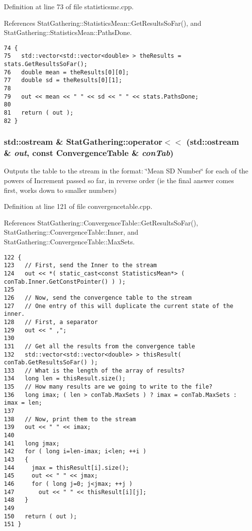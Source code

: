 Definition at line 73 of file statisticsmc.cpp.

References StatGathering::StatisticsMean::GetResultsSoFar(), and StatGathering::StatisticsMean::PathsDone.

\begin{Code}\begin{verbatim}74 {
75   std::vector<std::vector<double> > theResults = stats.GetResultsSoFar();
76   double mean = theResults[0][0];
77   double sd = theResults[0][1];
78 
79   out << mean << " " << sd << " " << stats.PathsDone;
80 
81   return ( out );
82 }
\end{verbatim}
\end{Code}


\subsubsection{\setlength{\rightskip}{0pt plus 5cm}std::ostream \& StatGathering::operator$<$$<$ (std::ostream \& {\em out}, const ConvergenceTable \& {\em conTab})}\label{namespaceStatGathering_571c4a864b3e5d6ed6047901f8634376}


Outputs the table to the stream in the format: \char`\"{}Mean SD Number\char`\"{} for each of the powers of Increment passed so far, in reverse order (ie the final answer comes first, works down to smaller numbers) 

Definition at line 121 of file convergencetable.cpp.

References StatGathering::ConvergenceTable::GetResultsSoFar(), StatGathering::ConvergenceTable::Inner, and StatGathering::ConvergenceTable::MaxSets.

\begin{Code}\begin{verbatim}122 {
123   // First, send the Inner to the stream
124   out << *( static_cast<const StatisticsMean*> ( conTab.Inner.GetConstPointer() ) );
125 
126   // Now, send the convergence table to the stream
127   // One entry of this will duplicate the current state of the inner.
128   // First, a separator
129   out << " ,";
130 
131   // Get all the results from the convergence table
132   std::vector<std::vector<double> > thisResult( conTab.GetResultsSoFar() );
133   // What is the length of the array of results?
134   long len = thisResult.size();
135   // How many results are we going to write to the file?
136   long imax; ( len > conTab.MaxSets ) ? imax = conTab.MaxSets : imax = len;
137   
138   // Now, print them to the stream
139   out << " " << imax;
140 
141   long jmax;
142   for ( long i=len-imax; i<len; ++i )
143   {
144     jmax = thisResult[i].size();
145     out << " " << jmax;
146     for ( long j=0; j<jmax; ++j )
147       out << " " << thisResult[i][j];
148   }
149 
150   return ( out );
151 }
\end{verbatim}
\end{Code}


